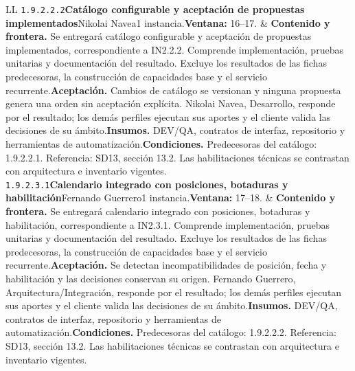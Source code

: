 \begin{longtable}{L{\tabcolsep\relax}L{\tabcolsep\relax}}
\texttt{1.\allowbreak{}9.\allowbreak{}2.\allowbreak{}2.\allowbreak{}2}\newline{}\textbf{Catálogo configurable y aceptación de propuestas implementados}\newline{}Nikolai Navea\newline{}1 instancia.\newline{}\textbf{Ventana:} 16--17. & \textbf{Contenido y frontera.} Se entregará catálogo configurable y aceptación de propuestas implementados, correspondiente a IN2.2.2. Comprende implementación, pruebas unitarias y documentación del resultado. Excluye los resultados de las fichas predecesoras, la construcción de capacidades base y el servicio recurrente.\newline{}\textbf{Aceptación.} Cambios de catálogo se versionan y ninguna propuesta genera una orden sin aceptación explícita. Nikolai Navea, Desarrollo, responde por el resultado; los demás perfiles ejecutan sus aportes y el cliente valida las decisiones de su ámbito.\newline{}\textbf{Insumos.} DEV/QA, contratos de interfaz, repositorio y herramientas de automatización.\newline{}\textbf{Condiciones.} Predecesoras del catálogo: 1.9.2.2.1. Referencia: SD13, sección 13.2. Las habilitaciones técnicas se contrastan con arquitectura e inventario vigentes.\\\hline
\texttt{1.\allowbreak{}9.\allowbreak{}2.\allowbreak{}3.\allowbreak{}1}\newline{}\textbf{Calendario integrado con posiciones, botaduras y habilitación}\newline{}Fernando Guerrero\newline{}1 instancia.\newline{}\textbf{Ventana:} 17--18. & \textbf{Contenido y frontera.} Se entregará calendario integrado con posiciones, botaduras y habilitación, correspondiente a IN2.3.1. Comprende implementación, pruebas unitarias y documentación del resultado. Excluye los resultados de las fichas predecesoras, la construcción de capacidades base y el servicio recurrente.\newline{}\textbf{Aceptación.} Se detectan incompatibilidades de posición, fecha y habilitación y las decisiones conservan su origen. Fernando Guerrero, Arquitectura/Integración, responde por el resultado; los demás perfiles ejecutan sus aportes y el cliente valida las decisiones de su ámbito.\newline{}\textbf{Insumos.} DEV/QA, contratos de interfaz, repositorio y herramientas de automatización.\newline{}\textbf{Condiciones.} Predecesoras del catálogo: 1.9.2.2.2. Referencia: SD13, sección 13.2. Las habilitaciones técnicas se contrastan con arquitectura e inventario vigentes.\\\hline

\end{longtable}
